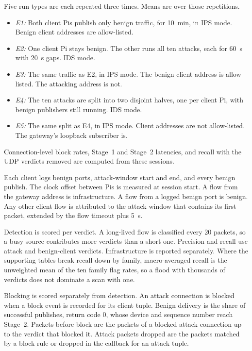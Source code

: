 \documentclass[journal]{IEEEtran}
\begin{document}
Five run types are each repeated three times. Means are over those repetitions.
\begin{itemize}
  \item \textit{E1:} Both client Pis publish only benign traffic, for 10~min, in IPS mode. Benign client addresses are allow-listed.
  \item \textit{E2:} One client Pi stays benign. The other runs all ten attacks, each for 60~s with 20~s gaps. IDS mode.
  \item \textit{E3:} The same traffic as E2, in IPS mode. The benign client address is allow-listed. The attacking address is not.
  \item \textit{E4:} The ten attacks are split into two disjoint halves, one per client Pi, with benign publishers still running. IDS mode.
  \item \textit{E5:} The same split as E4, in IPS mode. Client addresses are not allow-listed. The gateway's loopback subscriber is.
\end{itemize}
Connection-level block rates, Stage~1 and Stage~2 latencies, and recall with the UDP verdicts removed are computed from these sessions.

Each client logs benign ports, attack-window start and end, and every benign publish. The clock offset between Pis is measured at session start. A flow from the gateway address is infrastructure. A flow from a logged benign port is benign. Any other client flow is attributed to the attack window that contains its first packet, extended by the flow timeout plus 5~s.

Detection is scored per verdict. A long-lived flow is classified every 20 packets, so a busy source contributes more verdicts than a short one. Precision and recall use attack and benign-client verdicts. Infrastructure is reported separately. Where the supporting tables break recall down by family, macro-averaged recall is the unweighted mean of the ten family flag rates, so a flood with thousands of verdicts does not dominate a scan with one.

Blocking is scored separately from detection. An attack connection is blocked when a block event is recorded for its client tuple. Benign delivery is the share of successful publishes, return code 0, whose device and sequence number reach Stage~2. Packets before block are the packets of a blocked attack connection up to the verdict that blocked it. Attack packets dropped are the packets matched by a block rule or dropped in the callback for an attack tuple.
\end{document}
